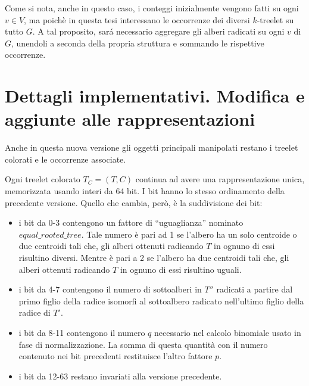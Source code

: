 Come si nota, anche in questo caso, i conteggi inizialmente vengono fatti su ogni $ v\in V $, ma poich\`e in questa tesi interessano le occorrenze dei diversi $ k $-treelet su tutto $ G $.
A tal proposito, sar\'a necessario aggregare gli alberi radicati su ogni $ v $ di $ G $, unendoli a seconda della propria struttura e sommando le rispettive occorrenze.

\section{Dettagli implementativi. Modifica e aggiunte alle rappresentazioni}
\label{cap 3:3}
Anche in questa nuova versione gli oggetti principali manipolati restano i treelet colorati e le occorrenze associate.

Ogni treelet colorato $ T_C = (T,C)$ continua ad avere una rappresentazione unica, memorizzata usando interi da 64 bit.
I bit hanno lo stesso ordinamento della precedente versione.
Quello che cambia, per\`o, \`e la suddivisione dei bit:
\begin{itemize}
	\item i bit da 0-3 contengono un fattore di ``uguaglianza'' nominato $ \textit{equal\_rooted\_tree} $.
	Tale numero \`e pari ad 1 se l'albero ha un solo centroide o due centroidi tali che, gli alberi ottenuti radicando $ T $ in ognuno di essi risultino diversi.
	Mentre \`e pari a  2 se l'albero ha due centroidi tali che, gli alberi ottenuti radicando $ T $ in ognuno di essi risultino uguali.
	\item  i bit da 4-7 contengono il numero di sottoalberi in $ T'' $ radicati a partire dal primo figlio della radice isomorfi al sottoalbero radicato nell'ultimo figlio della radice di $ T' $.
	\item i bit da 8-11 contengono il numero $ q $ necessario nel calcolo binomiale usato in fase di normalizzazione.
	La somma di questa quantit\`a con il numero contenuto nei bit precedenti restituisce l'altro fattore $ p $.
	\item i bit da 12-63 restano invariati alla versione precedente.	  
\end{itemize} 

